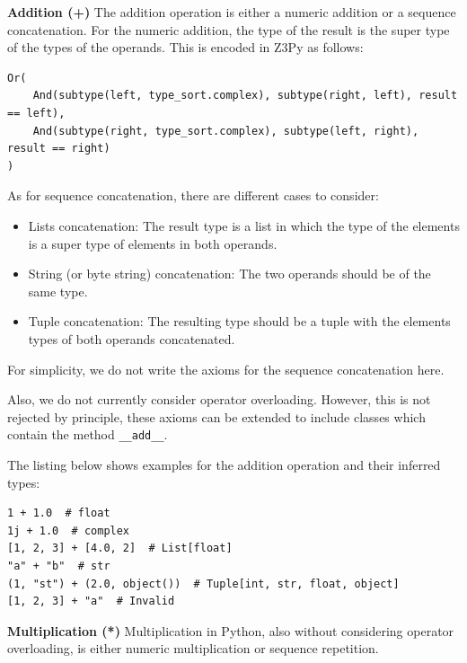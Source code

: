 \textbf{Addition (+)}
The addition operation is either a numeric addition or a sequence concatenation. For the numeric addition, the type of the result is the super type of the types of the operands. This is encoded in Z3Py as follows:

\begin{lstlisting}
Or(
	And(subtype(left, type_sort.complex), subtype(right, left), result == left),
	And(subtype(right, type_sort.complex), subtype(left, right), result == right)
)
\end{lstlisting}

As for sequence concatenation, there are different cases to consider:

\begin{itemize}
	\item Lists concatenation: The result type is a list in which the type of the elements is a super type of elements in both operands.
	\item String (or byte string) concatenation: The two operands should be of the same type.
	\item Tuple concatenation: The resulting type should be a tuple with the elements types of both operands concatenated.
\end{itemize}

For simplicity, we do not write the axioms for the sequence concatenation here.

Also, we do not currently consider operator overloading. However, this is not rejected by principle, these axioms can be extended to include classes which contain the method \lstinline|__add__|.

The listing below shows examples for the addition operation and their inferred types:

\begin{lstlisting}
1 + 1.0  # float
1j + 1.0  # complex
[1, 2, 3] + [4.0, 2]  # List[float]
"a" + "b"  # str
(1, "st") + (2.0, object())  # Tuple[int, str, float, object]
[1, 2, 3] + "a"  # Invalid
\end{lstlisting}

\textbf{Multiplication (*)}
Multiplication in Python, also without considering operator overloading, is either numeric multiplication or sequence repetition.

